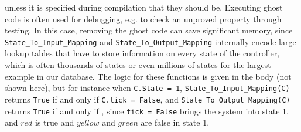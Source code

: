 \documentclass[runningheads]{llncs}
\begin{document}
unless it is specified during compilation that they should be.
Executing ghost code is often used for debugging, e.g. to check an unproved property through testing. 
In this case, removing the ghost code can save significant memory, 
since \lstinline{State_To_Input_Mapping} and \lstinline{State_To_Output_Mapping} 
internally encode large lookup tables that have to store information on every state of the controller, 
which is often thousands of states or even millions of states for the largest example in our database.
The logic for these functions is given in the body (not shown here), but for instance when \lstinline{C.State = 1}, 
\lstinline{State_To_Input_Mapping(C)} returns \lstinline{True} if and only if \lstinline{C.tick = False}, and 
\lstinline{State_To_Output_Mapping(C)} returns \lstinline{True} if and only if 
, 
since \lstinline{tick = False} brings the system into state 1, and $red$ is true and $yellow$ and $green$ are false in state 1.
 
\end{document}
